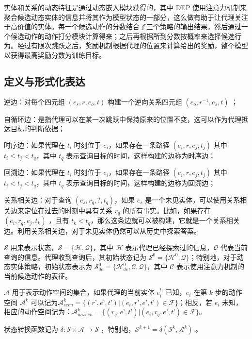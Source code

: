 \documentclass[a4paper, AutoFakeBold]{article}
\begin{document}
实体和关系的动态特征是通过动态嵌入模块获得的，其中 DEP 使用注意力机制来聚合候选动态实体的信息并将其作为模型状态的一部分，这么做有助于让代理关注于高价值的实体。每一个候选动作的分数结合了三个策略的输出结果，然后通过一个候选动作的动作打分模块计算得来；之后再根据所到分数按概率来选择候选行为。经过有限次跳跃之后，奖励机制根据代理的位置来计算给出的奖励，整个模型以获得最高奖励分数为训练目标。


\subsection{定义与形式化表达}

逆边：对每个四元组 $(e_s,r,e_o,t)$ 构建一个逆向关系四元组 $(e_o,r^{-1},e_s,t)$ ；

自循环边：是指代理可以在某一次跳跃中保持原来的位置不变，这可以作为代理抵达目标的判断依据；

时序边：如果代理在 $t_i$ 时刻位于 $e_i$，如果存在一条路径 $(e_i,r,e_j,t_j)$ 其中 $t_i\le t_j<t_q$，其中 $t_q$ 表示查询目标的时间，这样构建的边称为时序边；

回溯边：如果代理在 $t_i$ 时刻位于 $e_i$，如果存在一条路径 $(e_i,r,e_j,t_j)$ 其中 $t_i< t_j<t_q$，其中 $t_q$ 表示查询目标的时间，这样构建的边称为回溯边；

关系相关边：对于查询 $(e_s,r_q,?,t_q)$，如果 $e_s$ 是一个未见实体，可以使用关系相关边来定位在过去的时刻中具有关系 $r_q$ 的所有事实。比如，如果存在 $(e_i,r_q,e_j,t_k)$ ，且有 $t_k<t_q$，那么这条边就可以被构建，它就是一个关系相关边。利用关系相关边，对于未见实体仍然可以从历史中探索答案。

${\mathcal S}$ 用来表示状态，${\mathcal S}=\{{\mathcal H},{\mathcal Q}\}$，其中 ${\mathcal H}$ 表示代理已经探索过的信息，${\mathcal Q}$ 代表当前查询的信息。代理收到查询后，其初始状态记为 ${\mathcal S}^0=\{{\mathcal H}^0,{\mathcal Q}\}$；特别地，对于动态实体策略，初始状态表示为 ${\mathcal S}^0_{de}=\{{\mathcal H}^0_{de},{\mathcal C},{\mathcal Q}\}$，其中 ${\mathcal C}$ 表示使用注意力机制的当前候选动作的表征。

${\mathcal A}$ 用于表示动作空间的集合，如果代理的当前实体 $e_i^{t_i}$ 已知，$e_i$ 在第 $k$ 步的动作空间 ${\mathcal A}^k$ 可以记为${\mathcal A}^k_{seen}=\{(r’,e’,t’)|(e_i,r’,e’,t’)\in{\mathcal F}\}$；相反，若 $e_i$ 未知，相应的动作空间记为：${\mathcal A}^k_{unseen}=\{(r_q,e’,t’)|(e_i,r_q,e’,t’)\in{\mathcal F}\}$。

状态转换函数记为 $\delta:{\mathcal S}\times{\mathcal A}\rightarrow{\mathcal S}$ ，特别地，${\mathcal S}^{k+1}=\delta({\mathcal S}^k,{\mathcal A}^k)$ 。
\end{document}
